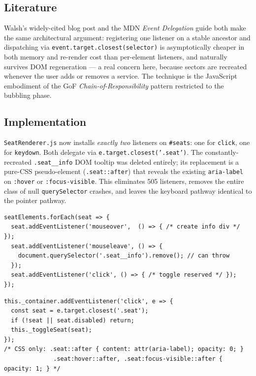 \documentclass[a4paper,11pt]{article}
\begin{document}
\subsection{Literature}
Walsh's widely-cited blog post \cite{walsh2011delegation} and the
MDN \textit{Event Delegation} guide \cite{mdn_event_delegation}
both make the same architectural argument: registering one listener
on a stable ancestor and dispatching via
\texttt{event.target.closest(selector)} is asymptotically cheaper in
both memory and re-render cost than per-element listeners, and
naturally survives DOM regeneration --- a real concern here, because
sectors are recreated whenever the user adds or removes a service.
The technique is the JavaScript embodiment of the GoF
\textit{Chain-of-Responsibility} pattern restricted to the bubbling
phase.

\subsection{Implementation}
\texttt{SeatRenderer.js} now installs \emph{exactly two} listeners on
\texttt{\#seats}: one for \texttt{click}, one for \texttt{keydown}.
Both delegate via \texttt{e.target.closest('.seat')}.  The
constantly-recreated \texttt{.seat\_\_info} DOM tooltip was deleted
entirely; its replacement is a pure-CSS pseudo-element
(\texttt{.seat::after}) that reveals the existing
\texttt{aria-label} on \texttt{:hover} or \texttt{:focus-visible}.
This eliminates 505 listeners, removes the entire class of null
\texttt{querySelector} crashes, and leaves the keyboard pathway
identical to the pointer pathway.

\begin{lstlisting}[caption={Original: $N$ listeners + DOM-mutating tooltip.},captionpos=b]
seatElements.forEach(seat => {
  seat.addEventListener('mouseover',  () => { /* create info div */ });
  seat.addEventListener('mouseleave', () => {
    document.querySelector('.seat__info').remove(); // can throw
  });
  seat.addEventListener('click', () => { /* toggle reserved */ });
});
\end{lstlisting}
\begin{lstlisting}[caption={Refactored: one delegated listener; tooltip via CSS.},captionpos=b]
this._container.addEventListener('click', e => {
  const seat = e.target.closest('.seat');
  if (!seat || seat.disabled) return;
  this._toggleSeat(seat);
});
/* CSS only: .seat::after { content: attr(aria-label); opacity: 0; }
              .seat:hover::after, .seat:focus-visible::after { opacity: 1; } */
\end{lstlisting}
\end{document}
